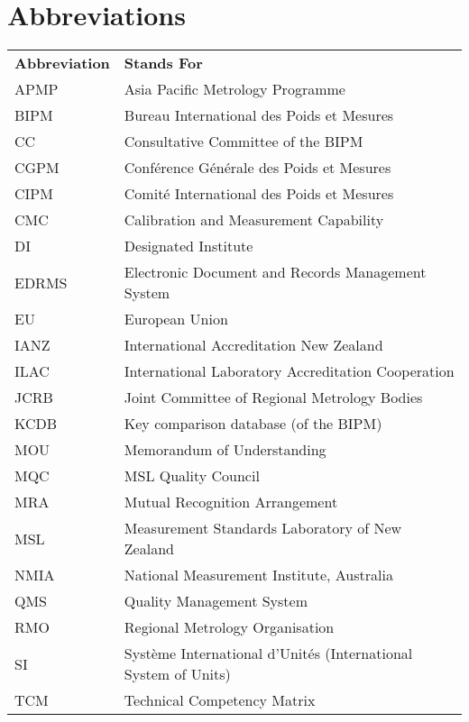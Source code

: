 \section{Abbreviations}
\begin{center}
{\renewcommand*{\arraystretch}{1.4}
\begin{tabular}{p{14.07em}p{25em}}
	\rowcolor[rgb]{ 0,  0,  0} 
	\textcolor[rgb]{ 1,  1,  1}{\textbf{Abbreviation}} & 
	\textcolor[rgb]{ 1,  1,  1}{\textbf{Stands For}} \\
APMP & Asia Pacific Metrology Programme \\ 
BIPM & Bureau International des Poids et Mesures \\ 
CC & Consultative Committee of the BIPM \\ 
CGPM & Conf\'erence G\'en\'erale des Poids et Mesures \\ 
CIPM & Comit\'e International des Poids et Mesures \\
CMC & Calibration and Measurement Capability \\
DI & Designated Institute \\
EDRMS & Electronic Document and Records Management System \\
EU & European Union \\
IANZ & International Accreditation New Zealand \\
ILAC & International Laboratory Accreditation Cooperation \\
JCRB & Joint Committee of Regional Metrology Bodies \\
KCDB & Key comparison database (of the BIPM)\\
MOU & Memorandum of Understanding \\
MQC & MSL Quality Council \\
MRA & Mutual Recognition Arrangement \\
MSL & Measurement Standards Laboratory of New Zealand \\
NMIA & National Measurement Institute, Australia \\
QMS & Quality Management System \\
RMO & Regional Metrology Organisation \\
SI & Système International d'Unités (International System of Units) \\
TCM & Technical Competency Matrix \\
\hline 
\end{tabular} 
}
\end{center}
